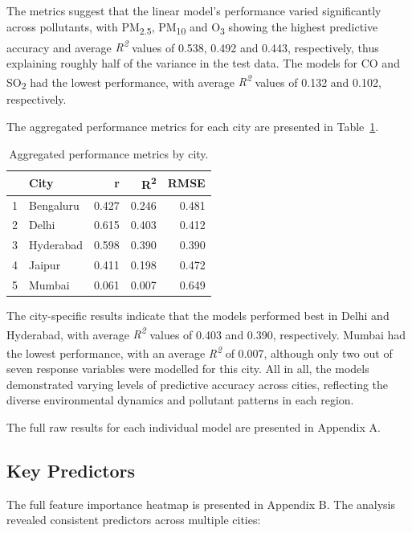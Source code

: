 \documentclass[twoside,11pt]{article}
\begin{document}
The metrics suggest that the linear model's performance varied significantly across pollutants, with PM\textsubscript{2.5}, PM\textsubscript{10} and O\textsubscript{3} showing the highest predictive accuracy and average \textit{R\textsuperscript{2}} values of 0.538, 0.492 and 0.443, respectively, thus explaining roughly half of the variance in the test data. The models for CO and SO\textsubscript{2} had the lowest performance, with average \textit{R\textsuperscript{2}} values of 0.132 and 0.102, respectively.

The aggregated performance metrics for each city are presented in Table~\ref{tab:performance_metrics_by_city}.

\begin{table}[ht]
\centering
\begin{tabular}{rlrrr}
  \hline
  & City & r & R\textsuperscript{2} & RMSE \\
  \hline
1 & Bengaluru & 0.427 & 0.246 & 0.481 \\ 
  2 & Delhi & 0.615 & 0.403 & 0.412 \\ 
  3 & Hyderabad & 0.598 & 0.390 & 0.390 \\ 
  4 & Jaipur & 0.411 & 0.198 & 0.472 \\ 
  5 & Mumbai & 0.061 & 0.007 & 0.649 \\ 
    \hline
\end{tabular}
\caption{Aggregated performance metrics by city.}
\label{tab:performance_metrics_by_city}
\end{table}

The city-specific results indicate that the models performed best in Delhi and Hyderabad, with average \textit{R\textsuperscript{2}} values of 0.403 and 0.390, respectively. Mumbai had the lowest performance, with an average \textit{R\textsuperscript{2}} of 0.007, although only two out of seven response variables were modelled for this city. All in all, the models demonstrated varying levels of predictive accuracy across cities, reflecting the diverse environmental dynamics and pollutant patterns in each region.

The full raw results for each individual model are presented in Appendix A.

\subsection{Key Predictors}

The full feature importance heatmap is presented in Appendix B. The analysis revealed consistent predictors across multiple cities:
\end{document}
